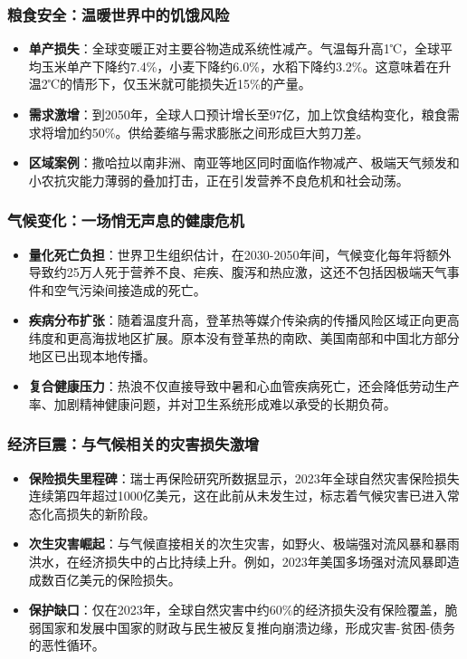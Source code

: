 \documentclass[11pt]{beamer}
\begin{document}
\begin{frame}
\frametitle{粮食安全：温暖世界中的饥饿风险}
\begin{itemize}
    \item \textbf{单产损失}：全球变暖正对主要谷物造成系统性减产。气温每升高1℃，全球平均玉米单产下降约7.4\%，小麦下降约6.0\%，水稻下降约3.2\%。这意味着在升温2℃的情形下，仅玉米就可能损失近15\%的产量。
    \item \textbf{需求激增}：到2050年，全球人口预计增长至97亿，加上饮食结构变化，粮食需求将增加约50\%。供给萎缩与需求膨胀之间形成巨大剪刀差。
    \item \textbf{区域案例}：撒哈拉以南非洲、南亚等地区同时面临作物减产、极端天气频发和小农抗灾能力薄弱的叠加打击，正在引发营养不良危机和社会动荡。
\end{itemize}
\end{frame}

\begin{frame}
\frametitle{气候变化：一场悄无声息的健康危机}
\begin{itemize}
    \item \textbf{量化死亡负担}：世界卫生组织估计，在2030-2050年间，气候变化每年将额外导致约25万人死于营养不良、疟疾、腹泻和热应激，这还不包括因极端天气事件和空气污染间接造成的死亡。
    \item \textbf{疾病分布扩张}：随着温度升高，登革热等媒介传染病的传播风险区域正向更高纬度和更高海拔地区扩展。原本没有登革热的南欧、美国南部和中国北方部分地区已出现本地传播。
    \item \textbf{复合健康压力}：热浪不仅直接导致中暑和心血管疾病死亡，还会降低劳动生产率、加剧精神健康问题，并对卫生系统形成难以承受的长期负荷。
\end{itemize}
\end{frame}

\begin{frame}
\frametitle{经济巨震：与气候相关的灾害损失激增}
\begin{itemize}
    \item \textbf{保险损失里程碑}：瑞士再保险研究所数据显示，2023年全球自然灾害保险损失\alert{连续第四年超过1000亿美元}，这在此前从未发生过，标志着气候灾害已进入常态化高损失的新阶段。
    \item \textbf{次生灾害崛起}：与气候直接相关的次生灾害，如野火、极端强对流风暴和暴雨洪水，在经济损失中的占比持续上升。例如，2023年美国多场强对流风暴即造成数百亿美元的保险损失。
    \item \textbf{保护缺口}：仅在2023年，全球自然灾害中约60\%的经济损失没有保险覆盖，脆弱国家和发展中国家的财政与民生被反复推向崩溃边缘，形成灾害-贫困-债务的恶性循环。
\end{itemize}
\end{frame}
\end{document}
